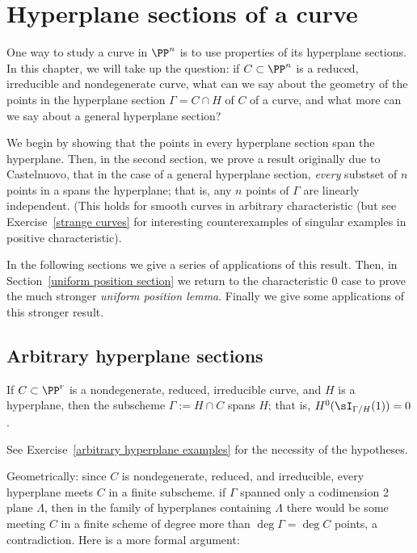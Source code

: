 



\chapter{Hyperplane sections of a curve}\label{uniform position}

One way to study a curve in $\PP^n$ is to use properties of its hyperplane sections. In this chapter, we will take up the question: if $C \subset \PP^n$ is a reduced, irreducible and nondegenerate curve, what can we say about the geometry of the points in the  hyperplane section $\Gamma = C \cap H$ of $C$ of a curve, and what more can we say about a general hyperplane section?

We begin by showing that the points in every hyperplane section span the hyperplane. Then, in the second section, we prove a result originally due to Castelnuovo, that in the case of a general hyperplane section, \emph{every} substset of $n$ points in a spans the hyperplane; that is, any $n$ points of $\Gamma$ are linearly independent. (This 
holds for smooth curves in arbitrary characteristic (but see Exercise~\ref{strange curves} for
interesting counterexamples of singular examples in positive characteristic). 

In the following sections we give a series of applications of this result. Then, in Section~\ref{uniform position section} we return to the characteristic 0 case to prove the much stronger \emph{uniform position lemma}. Finally we give some applications
of this stronger result.
\section{Arbitrary hyperplane sections}

\begin{proposition}\label{arbitrary hyperplane}
If $C\subset \PP^r$ is a nondegenerate, reduced, irreducible curve, and $H$ is a hyperplane, then the subscheme
$\Gamma := H\cap C$ spans $H$; that is, $H^0(\sI_{\Gamma/H}(1)) = 0$.
\end{proposition}

See Exercise~\ref{arbitrary hyperplane examples} for the necessity of the hypotheses.

Geometrically: since $C$ is nondegenerate, reduced, and irreducible, every hyperplane meets $C$ in a finite subscheme.
if $\Gamma$ spanned only a codimension 2 plane $\Lambda$, then in the family of hyperplanes
containing $\Lambda$ there would be some meeting $C$ in a finite scheme of degree more than $\deg \Gamma = \deg C$
points, a contradiction. Here is a more formal argument:

